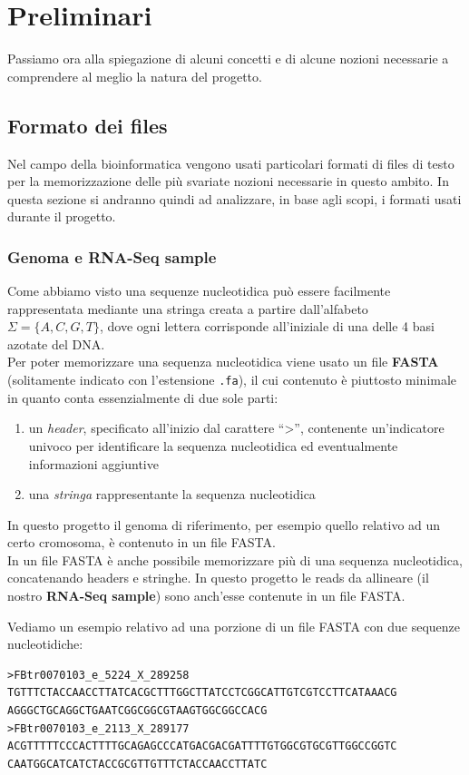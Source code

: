 \documentclass[a4paper,12pt, oneside]{book}
\begin{document}
\chapter{Preliminari}
Passiamo ora alla spiegazione di alcuni concetti e di alcune nozioni necessarie
a comprendere al meglio la natura del progetto.
\section{Formato dei files}
Nel campo della bioinformatica vengono usati particolari formati di files di
testo per la memorizzazione delle più svariate nozioni necessarie in questo
ambito. In questa sezione si andranno quindi ad analizzare, in base agli scopi,
i formati usati durante il progetto.
\subsection{Genoma e RNA-Seq sample}
Come abbiamo visto una sequenze nucleotidica può essere facilmente rappresentata
mediante una stringa creata a partire dall'alfabeto $\Sigma=\{A,C,G,T\}$, dove ogni
lettera corrisponde all'iniziale di una delle 4 basi azotate del DNA.\\
Per poter memorizzare una sequenza nucleotidica viene usato un file
\textbf{FASTA} \cite{fasta} (solitamente indicato con l'estensione
\texttt{.fa}), il cui contenuto è piuttosto minimale in quanto conta
essenzialmente di due sole parti:
\begin{enumerate}
  \item un \textit{header}, specificato all'inizio dal carattere ``>'',
  contenente un'indicatore univoco per identificare la sequenza nucleotidica ed
  eventualmente informazioni aggiuntive
  \item una \textit{stringa} rappresentante la sequenza nucleotidica
\end{enumerate}
In questo progetto il genoma di riferimento, per esempio quello relativo ad un
certo cromosoma, è contenuto in un file FASTA.\\
In un file FASTA è anche possibile memorizzare più di una sequenza nucleotidica,
concatenando headers e stringhe. In questo progetto le reads da allineare (il
nostro \textbf{RNA-Seq sample}) sono anch'esse contenute in un file FASTA.
\begin{esempio}
  Vediamo un esempio relativo ad una porzione di un file FASTA con due sequenze
  nucleotidiche: 
\begin{verbatim}
>FBtr0070103_e_5224_X_289258
TGTTTCTACCAACCTTATCACGCTTTGGCTTATCCTCGGCATTGTCGTCCTTCATAAACG
AGGGCTGCAGGCTGAATCGGCGGCGTAAGTGGCGGCCACG
>FBtr0070103_e_2113_X_289177
ACGTTTTTCCCACTTTTGCAGAGCCCATGACGACGATTTTGTGGCGTGCGTTGGCCGGTC
CAATGGCATCATCTACCGCGTTGTTTCTACCAACCTTATC
\end{verbatim}
\end{esempio}
\end{document}
